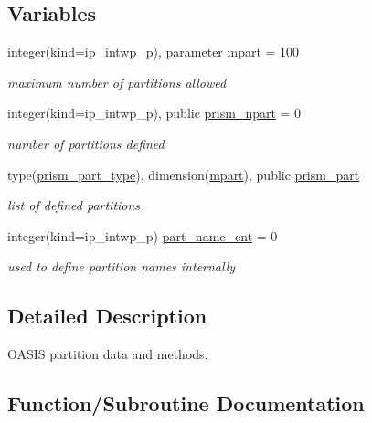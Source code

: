 \subsection*{Variables}
\begin{DoxyCompactItemize}
\item 
integer(kind=ip\+\_\+intwp\+\_\+p), parameter \hyperlink{namespacemod__oasis__part_ab68d087792db0351181c9a97025d793b}{mpart} = 100
\begin{DoxyCompactList}\small\item\em maximum number of partitions allowed \end{DoxyCompactList}\item 
integer(kind=ip\+\_\+intwp\+\_\+p), public \hyperlink{namespacemod__oasis__part_ac8340e63b159a9786ad8fffabd1d47f8}{prism\+\_\+npart} = 0
\begin{DoxyCompactList}\small\item\em number of partitions defined \end{DoxyCompactList}\item 
type(\hyperlink{structmod__oasis__part_1_1prism__part__type}{prism\+\_\+part\+\_\+type}), dimension(\hyperlink{namespacemod__oasis__part_ab68d087792db0351181c9a97025d793b}{mpart}), public \hyperlink{namespacemod__oasis__part_a326ce52f630ba7e71905af864a6cb2dc}{prism\+\_\+part}
\begin{DoxyCompactList}\small\item\em list of defined partitions \end{DoxyCompactList}\item 
integer(kind=ip\+\_\+intwp\+\_\+p) \hyperlink{namespacemod__oasis__part_a8cee930f023feb7bcad4a0cab0b490a1}{part\+\_\+name\+\_\+cnt} = 0
\begin{DoxyCompactList}\small\item\em used to define partition names internally \end{DoxyCompactList}\end{DoxyCompactItemize}


\subsection{Detailed Description}
O\+A\+S\+IS partition data and methods. 

\subsection{Function/\+Subroutine Documentation}
\mbox{\label{namespacemod__oasis__part_af070605328f2b705735d7fbf8b838ff4}} 
